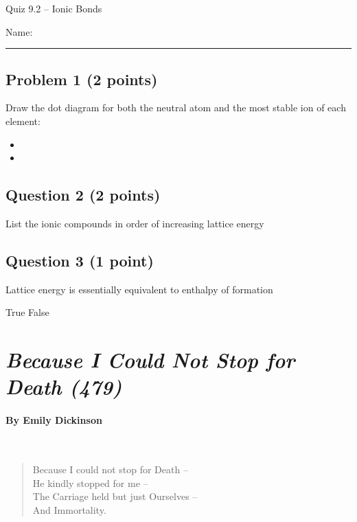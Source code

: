 \documentclass[11pt, letterpaper]{memoir}
\begin{document}
	\begin{center}
		{\large	Quiz 9.2 -- Ionic Bonds}
	\end{center}
{\large Name: \rule[-1mm]{4in}{.1pt}
	
	\subsection*{Problem 1 (2 points)}
	Draw the dot diagram for both the neutral atom and the most stable ion of each element:
	\begin{itemize}
		\item {}
		\item \vspace{2em}
	\end{itemize}
	
	\vspace{2em}
	\subsection*{Question 2 (2 points)}
	List the ionic compounds in order of increasing lattice energy
	
	 \hspace{2em}  \hspace{2em}  \hspace{2em}  \hspace{2em} 
	
	\vspace{8em}
	\subsection*{Question 3 (1 point)}
	Lattice energy is essentially equivalent to enthalpy of formation
	
	{\Large True \hspace{2em} False}
	

\newpage
\pagestyle{empty}
\addtocounter{page}{-1}
\section*{\emph{Because I Could Not Stop for Death (479)}}
\paragraph{By Emily Dickinson}~
\begin{verse}
	Because I could not stop for Death –\\
	He kindly stopped for me –\\
	The Carriage held but just Ourselves –\\
	And Immortality.


\end{verse}}
\end{document}
